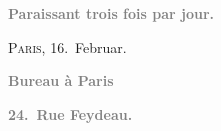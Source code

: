 \pstart
           \begin{otherlanguage}{french}\textcolor{gray}{\textbf{\textbf{Paraissant trois fois par jour.}}}\end{otherlanguage}\hfill \textsc{Paris}, 16. Februar.\pend
           
\pstart
           \begin{otherlanguage}{french}\textcolor{gray}{\textbf{\textbf{Bureau à Paris}}}\end{otherlanguage}\pend
           
\pstart
           \begin{otherlanguage}{french}\textcolor{gray}{\textbf{\textbf{24. Rue Feydeau.}}}\end{otherlanguage}\pend
           
